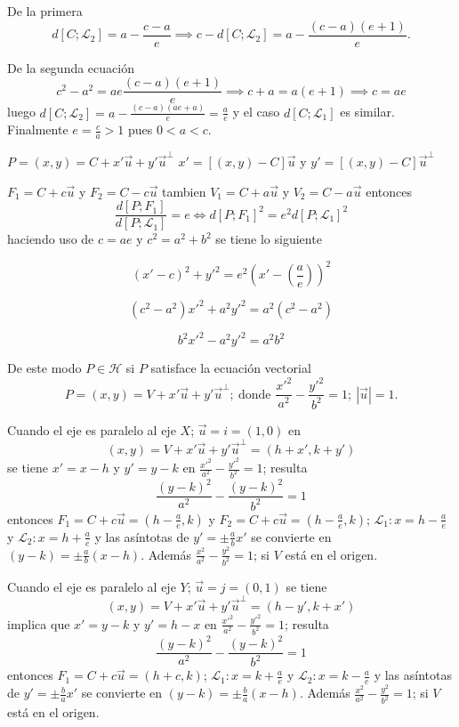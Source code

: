 \documentclass[10pt,]{krantz}
\theoremstyle{definition}
\theoremstyle{definition}
\theoremstyle{definition}
\theoremstyle{remark}
\begin{document}
De la primera \[d\left[C;\mathcal{L}_2\right]=a-\frac{c-a}{e}\implies c-d\left[C;\mathcal{L}_2\right]=a-\frac{(c-a)(e+1)}{e}.\]

De la segunda ecuación \[c^2-a^2=ae\frac{(c-a)(e+1)}{e}\implies c+a=a(e+1)\implies c=ae\] luego \(d\left[C;\mathcal{L}_2\right]=a-\frac{(c-a)(ae+a)}{e}=\frac{a}{e}\) y el caso \(d\left[C;\mathcal{L}_1\right]\) es similar. Finalmente \(e=\frac{c}{a}>1\) pues \(0<a<c.\)

\(P=(x,y)=C+x'\vec{u}+y'\vec{u}^\perp\) \(x'=[(x,y)-C]\vec{u}\) y \(y'=[(x,y)-C]\vec{u}^\perp\)

\(F_1=C+c\vec{u}\) y \(F_2=C-c\vec{u}\) tambien \(V_1=C+a\vec{u}\) y \(V_2=C-a\vec{u}\) entonces \[\frac{d\left[P;F_1\right]}{d\left[P;\mathcal{L}_1\right]}=e\iff d\left[P;F_1\right]^2=e^2d\left[P;\mathcal{L}_1\right]^2\] haciendo uso de \(c=ae\) y \(c^2=a^2+b^2\) se tiene lo siguiente

\[(x'-c)^2+y'^2=e^2\left(x'-\left(\frac{a}{e}\right)\right)^2\]

\[(c^2-a^2) x'^2+a^2y'^2=a^2(c^2-a^2)\]

\[b^2x'^2-a^2y'^2=a^2b^2\]

De este modo \(P\in\mathcal{H}\) si \(P\) satisface la ecuación vectorial \[P=(x,y)=V+x'\vec{u}+y'\vec{u}^\perp;\: \text{donde } \frac{x'^2}{a^2}-\frac{y'^2}{b^2}=1; \:\left|\vec{u}\right|=1.\]

Cuando el eje es paralelo al eje \(X\); \(\vec{u}=i=(1,0)\) en \[(x,y)=V+x'\vec{u}+y'\vec{u}^\perp=(h+x',k+y')\] se tiene \(x'=x-h\) y \(y'=y-k\) en \(\frac{x'^2}{a^2}-\frac{y'^2}{b^2}=1\); resulta \[\frac{(y-k)^2}{a^2}-\frac{(y-k)^2}{b^2}=1\] entonces \(F_1=C+c\vec{u}=(h-\frac{a}{e},k)\) y \(F_2=C+c\vec{u}=(h-\frac{a}{e},k)\); \(\mathcal{L}_1: x=h-\frac{a}{e}\) y \(\mathcal{L}_2: x=h+\frac{a}{e}\) y las asíntotas de \(y'=\pm\frac{a}{b}x'\) se convierte en \((y-k)=\pm\frac{a}{b}(x-h)\). Además \(\frac{x^2}{a^2}-\frac{y^2}{b^2}=1\); si \(V\) está en el origen.

Cuando el eje es paralelo al eje \(Y\); \(\vec{u}=j=(0,1)\) se tiene \[(x,y)=V+x'\vec{u}+y'\vec{u}^\perp=(h-y',k+x')\] implica que \(x'=y-k\) y \(y'=h-x\) en \(\frac{x'^2}{a^2}-\frac{y'^2}{b^2}=1\); resulta \[\frac{(y-k)^2}{a^2}-\frac{(y-k)^2}{b^2}=1\] entonces \(F_1=C+c\vec{u}=(h+c,k)\); \(\mathcal{L}_1: x=k+\frac{a}{e}\) y \(\mathcal{L}_2: x=k-\frac{a}{e}\) y las asíntotas de \(y'=\pm\frac{b}{a}x'\) se convierte en \((y-k)=\pm\frac{b}{a}(x-h)\). Además \(\frac{x^2}{a^2}-\frac{y^2}{b^2}=1\); si \(V\) está en el origen.
\end{document}
